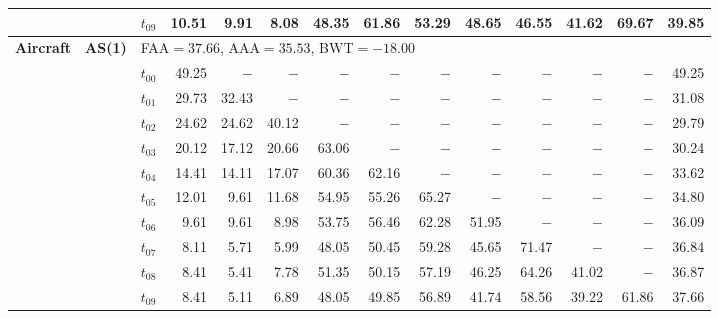 \begin{table}[ht]
\begin{tabular}{@{}l l l *{11}{r}@{}}
 & & $t_{09}$ & 10.51 & 9.91 & 8.08 & 48.35 & 61.86 & 53.29 & 48.65 & 46.55 & 41.62 & 69.67 & 39.85 \\
\midrule
\multirow{11}{*}{\textbf{Aircraft}} & \multirow{11}{*}{\textbf{AS(1)}} & \multicolumn{12}{l}{\quad\small FAA$=37.66$,\; AAA$=35.53$,\; BWT$=-18.00$} \\
 & & $t_{00}$ & 49.25 & $-$ & $-$ & $-$ & $-$ & $-$ & $-$ & $-$ & $-$ & $-$ & 49.25 \\
 & & $t_{01}$ & 29.73 & 32.43 & $-$ & $-$ & $-$ & $-$ & $-$ & $-$ & $-$ & $-$ & 31.08 \\
 & & $t_{02}$ & 24.62 & 24.62 & 40.12 & $-$ & $-$ & $-$ & $-$ & $-$ & $-$ & $-$ & 29.79 \\
 & & $t_{03}$ & 20.12 & 17.12 & 20.66 & 63.06 & $-$ & $-$ & $-$ & $-$ & $-$ & $-$ & 30.24 \\
 & & $t_{04}$ & 14.41 & 14.11 & 17.07 & 60.36 & 62.16 & $-$ & $-$ & $-$ & $-$ & $-$ & 33.62 \\
 & & $t_{05}$ & 12.01 & 9.61 & 11.68 & 54.95 & 55.26 & 65.27 & $-$ & $-$ & $-$ & $-$ & 34.80 \\
 & & $t_{06}$ & 9.61 & 9.61 & 8.98 & 53.75 & 56.46 & 62.28 & 51.95 & $-$ & $-$ & $-$ & 36.09 \\
 & & $t_{07}$ & 8.11 & 5.71 & 5.99 & 48.05 & 50.45 & 59.28 & 45.65 & 71.47 & $-$ & $-$ & 36.84 \\
 & & $t_{08}$ & 8.41 & 5.41 & 7.78 & 51.35 & 50.15 & 57.19 & 46.25 & 64.26 & 41.02 & $-$ & 36.87 \\
 & & $t_{09}$ & 8.41 & 5.11 & 6.89 & 48.05 & 49.85 & 56.89 & 41.74 & 58.56 & 39.22 & 61.86 & 37.66 \\
\bottomrule
\end{tabular}
\end{table}

